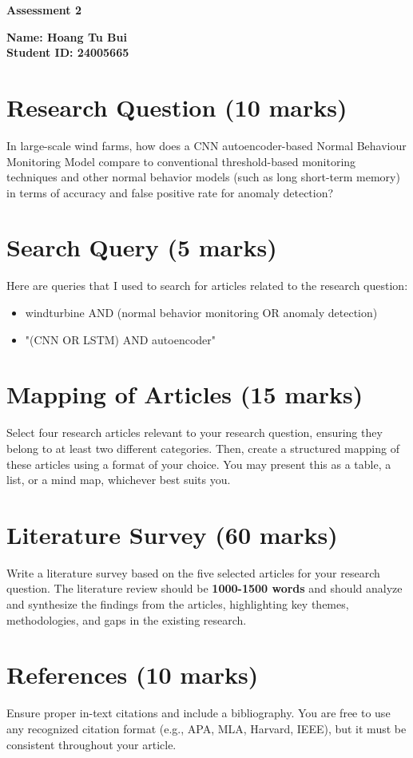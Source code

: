 \documentclass[a4paper,12pt]{article}
\begin{document}
\begin{center}
    \textbf{\Large Assessment 2} \vspace{0.5cm}
\end{center}

\textbf{Name: Hoang Tu Bui} \\
\textbf{Student ID: 24005665} 

\section{ Research Question (10 marks)}
In large-scale wind farms, how does a CNN autoencoder-based Normal Behaviour Monitoring Model compare to conventional threshold-based monitoring techniques and other normal behavior models (such as long short-term memory) in terms of accuracy and false positive rate for anomaly detection?

\section{Search Query (5 marks)}
Here are queries that I used to search for articles related to the research question:
\begin{itemize}
    \item windturbine AND (normal behavior monitoring OR anomaly detection)
    \item "(CNN OR LSTM) AND autoencoder"
\end{itemize}

\section{Mapping of Articles (15 marks)}
Select four research articles relevant to your research question, ensuring they belong to at least two different categories. Then, create a structured mapping of these articles using a format of your choice. You may present this as a table, a list, or a mind map, whichever best suits you.

\section{Literature Survey (60 marks)}
Write a literature survey based on the five selected articles for your research question. The literature review should be \textbf{1000-1500 words} and should analyze and synthesize the findings from the articles, highlighting key themes, methodologies, and gaps in the existing research.

\section{References (10 marks)}
Ensure proper in-text citations and include a bibliography. You are free to use any recognized citation format (e.g., APA, MLA, Harvard, IEEE), but it must be consistent throughout your article.
\end{document}
